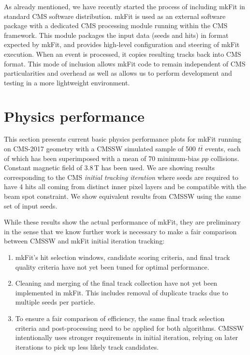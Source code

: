 \documentclass{webofc}
\def\mkfit{mkFit\xspace}
\begin{document}
As already mentioned, we have recently started the process of including \mkfit
in standard CMS software distribution. \mkfit is used as an external software
package with a dedicated CMS processing module running within the CMS
framework. This module packages the input data (seeds and hits) in format
expected by \mkfit, and provides high-level configuration and steering of
\mkfit execution. When an event is processed, it copies resulting tracks back
into CMS format. This mode of inclusion allows \mkfit code to remain
independent of CMS particularities and overhead as well as allows us to
perform development and testing in a more lightweight environment.


\section{Physics performance}
\label{sec:phys-perf}

This section presents current basic physics performance plots for \mkfit
running on CMS-2017 geometry with a CMSSW simulated sample of 500 $t\bar{t}$
events, each of which has been superimposed with a mean of 70 minimum-bias $pp$ collisions.
Constant magnetic field of 3.8\,T has been used. We are showing
results corresponding to the CMS \emph{initial tracking iteration} where seeds are
required to have 4 hits all coming from distinct inner pixel layers and be
compatible with the beam spot constraint. We show equivalent results from CMSSW using
the same set of input seeds.

While these results show the actual performance of \mkfit, they are
preliminary in the sense that we know further work is necessary to make a fair
comparison between CMSSW and \mkfit initial iteration tracking:
\begin{enumerate}[--]\topsep-2pt\itemsep-2pt
\item \mkfit's hit selection windows, candidate scoring criteria, and final track
  quality criteria have not yet been tuned for optimal performance.
\item Cleaning and merging of the final track collection have not yet been
  implemented in \mkfit. This includes removal of duplicate tracks due to
  multiple seeds per particle.
\item To ensure a fair comparison of efficiency, the same final track selection
  criteria and post-processing need to be applied for both algorithms. CMSSW
  intentionally uses stronger requirements in initial iteration, relying on later
  iterations to pick up less likely track candidates.
\end{enumerate}
\end{document}
